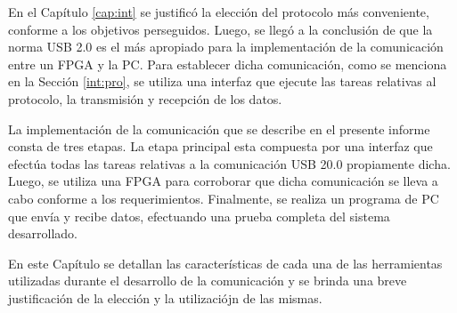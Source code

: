 En el Capítulo \ref{cap:int} se justificó la elección del protocolo más conveniente, conforme a los objetivos perseguidos. Luego, se llegó a la conclusión de que la norma USB 2.0 es el más apropiado para la implementación de la comunicación entre un FPGA y la PC. Para establecer dicha comunicación, como se menciona en la Sección \ref{int:pro}, se utiliza una interfaz que ejecute las tareas relativas al protocolo, la transmisión y recepción de los datos.%

La implementación de la comunicación que se describe en el presente informe consta de tres etapas. La etapa principal esta compuesta por una interfaz que efectúa todas las tareas relativas a la comunicación USB 20.0 propiamente dicha. Luego, se utiliza una FPGA para corroborar que dicha comunicación se lleva a cabo conforme a los requerimientos. Finalmente, se realiza un programa de PC que envía y recibe datos, efectuando una prueba completa del sistema desarrollado.

En este Capítulo se detallan las características de cada una de las herramientas utilizadas durante el desarrollo de la comunicación y se brinda una breve justificación de la elección y la utilizaciójn de las mismas.


